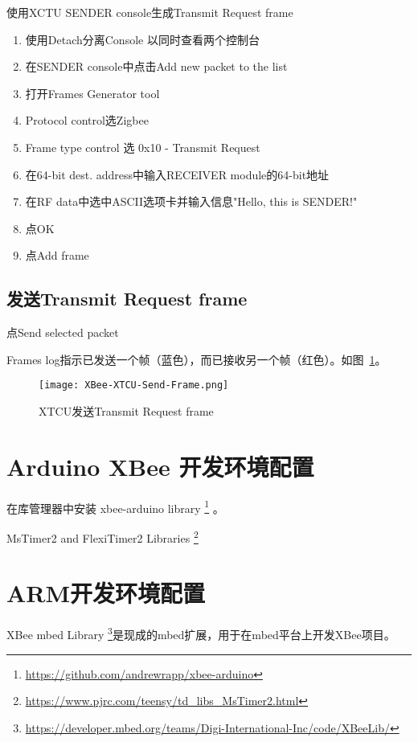 使用XCTU SENDER console生成Transmit Request frame

\begin{enumerate}
    \item 使用Detach分离Console 以同时查看两个控制台
    \item 在SENDER console中点击Add new packet to the list
    \item 打开Frames Generator tool
    \item Protocol control选Zigbee
    \item Frame type control 选 0x10 - Transmit Request
    \item 在64-bit dest. address中输入RECEIVER module的64-bit地址
    \item 在RF data中选中ASCII选项卡并输入信息"Hello, this is SENDER!"
    \item 点OK
    \item 点Add frame
\end{enumerate}

\subsection{发送Transmit Request frame}

点Send selected packet

Frames log指示已发送一个帧（蓝色），而已接收另一个帧（红色）。如图~\ref{fig:XBee-XTCU-Send-Frame}。

\begin{figure}[htbp]
    \centering
    \texttt{[image: XBee-XTCU-Send-Frame.png]}
    \caption{XTCU发送Transmit Request frame}
    \label{fig:XBee-XTCU-Send-Frame}
\end{figure}

\section{Arduino XBee 开发环境配置}

在库管理器中安装 xbee-arduino library \footnote{\url{https://github.com/andrewrapp/xbee-arduino}} 。

MsTimer2 and FlexiTimer2 Libraries \footnote{\url{https://www.pjrc.com/teensy/td_libs_MsTimer2.html}}

\section{ARM开发环境配置}

XBee mbed Library \footnote{\url{https://developer.mbed.org/teams/Digi-International-Inc/code/XBeeLib/}}是现成的mbed扩展，用于在mbed平台上开发XBee项目。